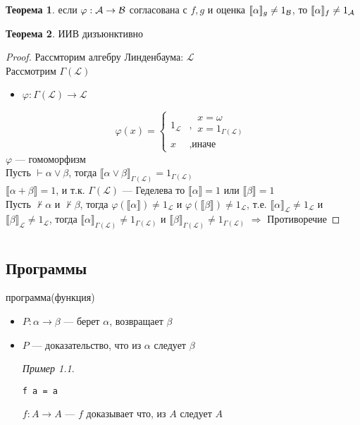 \documentclass[oneside]{book}
\theoremstyle{plain}
\theoremstyle{remark}
\newtheorem*{examp}{Пример}
\theoremstyle{definition}
\newtheorem{theorem}{Теорема}[section]
\begin{document}
\begin{theorem}
если \(\varphi: \mathcal{A} \to \mathcal{B}\) согласована с \(f, g\) и оценка \(\llbracket \alpha \rrbracket_g \neq 1_{\mathcal{B}}\), то \(\llbracket \alpha \rrbracket_f \neq 1_{\mathcal{A}}\)
\end{theorem}
\begin{theorem}
ИИВ дизъюнктивно
\end{theorem}
\begin{proof}
Рассмторим алгебру Линденбаума: \(\mathcal{L}\) \\
Рассмотрим \(\Gamma(\mathcal{L})\) \\
\begin{itemize}
\item \(\varphi: \Gamma(\mathcal{L}) \to \mathcal{L}\)
\end{itemize}
\[ \varphi(x) = \begin{cases}1_\mathcal{L} & ,\substack{x =\omega \\ x = 1_{\Gamma(\mathcal{L})}} \\ x & , \text{иначе}\end{cases} \] 
\(\varphi\) --- гомоморфизм \\
Пусть \(\vdash \alpha \vee \beta\), тогда \(\llbracket \alpha \vee \beta \rrbracket_{\Gamma(\mathcal{L})} = 1_{\Gamma(\mathcal{L})}\) \\
\(\llbracket \alpha + \beta \rrbracket = 1\), и т.к. \(\Gamma(\mathcal{L})\) --- Геделева то \(\llbracket \alpha \rrbracket = 1\) или \(\llbracket \beta \rrbracket = 1\) \\
Пусть \(\not \vdash \alpha\) и \(\not \vdash \beta\), тогда \(\varphi(\llbracket \alpha \rrbracket) \neq 1_\mathcal{L}\) и \(\varphi(\llbracket \beta \rrbracket) \neq 1_\mathcal{L}\), т.е. \(\llbracket \alpha \rrbracket_\mathcal{L} \neq 1_\mathcal{L}\) и \(\llbracket \beta \rrbracket_\mathcal{L} \neq 1_\mathcal{L}\), тогда \(\llbracket \alpha \rrbracket_{\Gamma(\mathcal{L})} \neq 1_{\Gamma(\mathcal{L})}\) и \(\llbracket \beta \rrbracket_{\Gamma(\mathcal{L})} \neq 1_{\Gamma(\mathcal{L})}\) \(\Rightarrow\) Противоречие
\end{proof}
\chapter{}
\label{sec:orga8d8e1f}
\section{Программы}
\label{sec:org75f9f76}
программа(функция)
\begin{itemize}
\item \(P: \alpha \to \beta\) --- берет \(\alpha\), возвращает \(\beta\)
\item \(P\) --- доказательство, что из \(\alpha\) следует \(\beta\)
\begin{examp}
\-
\begin{verbatim}
f a = a
\end{verbatim}
\(f: A \to A\) --- \(f\) доказывает что, из \(A\) следует \(A\)
\end{examp}
\end{itemize}
\end{document}
